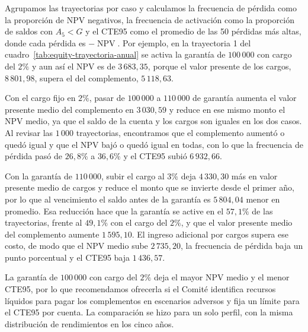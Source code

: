 \documentclass[11pt]{article}
\begin{document}
Agrupamos las trayectorias por caso y calculamos la frecuencia de pérdida como la proporción de NPV negativos, la frecuencia de activación como la proporción de saldos con $A_5<G$ y el CTE95 como el promedio de las 50 pérdidas más altas, donde cada pérdida es $-\operatorname{NPV}$. Por ejemplo, en la trayectoria 1 del cuadro~\ref{tab:equity-trayectoria-anual} se activa la garantía de $100\,000$ con cargo del $2\%$ y aun así el NPV es de $3\,683{,}35$, porque el valor presente de los cargos, $8\,801{,}98$, supera el del complemento, $5\,118{,}63$.

Con el cargo fijo en $2\%$, pasar de $100\,000$ a $110\,000$ de garantía aumenta el valor presente medio del complemento en $3\,030{,}59$ y reduce en ese mismo monto el NPV medio, ya que el saldo de la cuenta y los cargos son iguales en los dos casos. Al revisar las $1\,000$ trayectorias, encontramos que el complemento aumentó o quedó igual y que el NPV bajó o quedó igual en todas, con lo que la frecuencia de pérdida pasó de $26{,}8\%$ a $36{,}6\%$ y el CTE95 subió $6\,932{,}66$.

Con la garantía de $110\,000$, subir el cargo al $3\%$ deja $4\,330{,}30$ más en valor presente medio de cargos y reduce el monto que se invierte desde el primer año, por lo que al vencimiento el saldo antes de la garantía es $5\,804{,}04$ menor en promedio. Esa reducción hace que la garantía se active en el $57{,}1\%$ de las trayectorias, frente al $49{,}1\%$ con el cargo del $2\%$, y que el valor presente medio del complemento aumente $1\,595{,}10$. El ingreso adicional por cargos supera ese costo, de modo que el NPV medio sube $2\,735{,}20$, la frecuencia de pérdida baja un punto porcentual y el CTE95 baja $1\,436{,}57$.

La garantía de $100\,000$ con cargo del $2\%$ deja el mayor NPV medio y el menor CTE95, por lo que recomendamos ofrecerla si el Comité identifica recursos líquidos para pagar los complementos en escenarios adversos y fija un límite para el CTE95 por cuenta. La comparación se hizo para un solo perfil, con la misma distribución de rendimientos en los cinco años.


\clearpage
\begingroup
\setlength{\parskip}{0.55\baselineskip}

\endgroup

\clearpage

\end{document}
